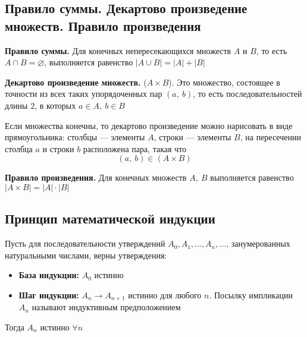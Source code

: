 \documentclass[a4paper]{article}
\begin{document}
\subsection{Правило суммы. Декартово произведение множеств. Правило произведения}
\textbf{Правило суммы.} Для конечных непересекающихся множеств $A$ и $B$, то есть $A\cap B=\varnothing$, выполняется равенство $|A\cup B|=|A|+|B|$

\textbf{Декартово произведение множеств.} ($A\times B$). Это множество, состоящее в точности из всех таких упорядоченных пар $(a,\ b)$, то есть последовательностей длины $2$, в которых $a\in A,\ b\in B$

Если множества конечны, то декартово произведение можно нарисовать в виде прямоугольника: столбцы — элементы $A$, строки — элементы $B$, на пересечении столбца $a$ и строки $b$ расположена пара, такая что $$(a,\ b)\in (A\times B)$$

\textbf{Правило произведения.} Для конечных множеств $A,\ B$ выполняется равенство $|A\times B|=|A|\cdot|B|$



\subsection{Принцип математической индукции}
\label{sec:1.14} Пусть для последовательности утверждений $A_0, A_1,\ldots, A_n, \ldots$, занумерованных натуральными числами, верны утверждения:
\begin{itemize}
    \item \textbf{База индукции:} $A_0$ истинно
    \item \textbf{Шаг индукции:} $A_n\rightarrow A_{n+1}$ истинно для любого $n$. Посылку импликации $A_n$ называют индуктивным предположением
\end{itemize}
Тогда $A_n$ истинно $\forall n$
\end{document}
